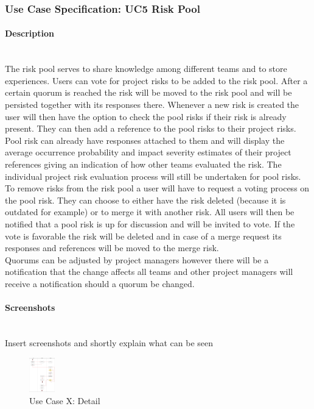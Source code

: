 \newpage
\subsubsection{Use Case Specification: \ac{UC}5 Risk Pool}
\label{sec:domainBbf}

\paragraph*{Description}\mbox{}\\
The risk pool serves to share knowledge among different teams and to store experiences. Users can vote for project risks to be added to the risk pool. After a certain quorum is reached the risk will be moved to the risk pool and will be persisted together with its responses there. Whenever a new risk is created the user will then have the option to check the pool risks if their risk is already present. They can then add a reference to the pool risks to their project risks. Pool risk can already have responses attached to them and will display the average occurrence probability and impact severity estimates of their project references giving an indication of how other teams evaluated the risk. The individual project risk evaluation process will still be undertaken for pool risks. \\
To remove risks from the risk pool a user will have to request a voting process on the pool risk. They can choose to either have the risk deleted (because it is outdated for example) or to merge it with another risk. All users will then be notified that a pool risk is up for discussion and will be invited to vote. If the vote is favorable the risk will be deleted and in case of a merge request its responses and references will be moved to the merge risk. \\
Quorums can be adjusted by project managers however there will be a notification that the change affects all teams and other project managers will receive a notification should a quorum be changed. 

\paragraph*{Screenshots}\mbox{}\\
Insert screenshots and shortly explain what can be seen
\begin{figure}[h] 
	\centering
	\includegraphics[width=0.1\textwidth]{Content/Domain/UC5RiskPoolDiagram.png}
	\caption{Use Case X: Detail}
	\label{fig:label5}
\end{figure}


